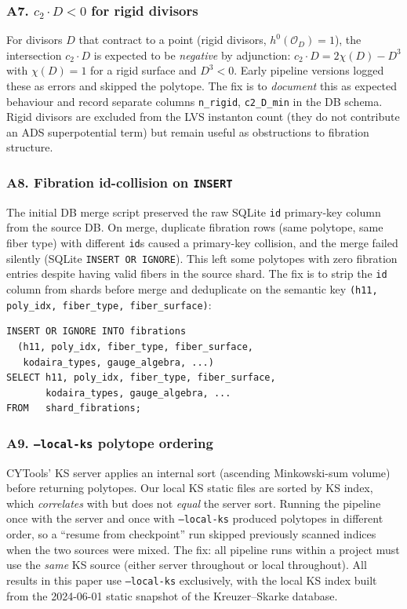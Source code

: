 \documentclass[11pt,a4paper]{article}
\newcommand{\cO}{\mathcal{O}}
\begin{document}
\subsubsection*{A7. $c_2\cdot D < 0$ for rigid divisors}

For divisors $D$ that contract to a point (rigid divisors,
$h^0(\cO_D)=1$), the intersection $c_2\cdot D$ is expected to be
\emph{negative} by adjunction: $c_2\cdot D = 2\chi(D) - D^3$
with $\chi(D) = 1$ for a rigid surface and $D^3 < 0$.
Early pipeline versions logged these as errors and skipped the
polytope.
The fix is to \emph{document} this as expected behaviour and record
separate columns \texttt{n\_rigid}, \texttt{c2\_D\_min} in the DB schema.
Rigid divisors are excluded from the LVS instanton count
(they do not contribute an ADS superpotential term) but remain
useful as obstructions to fibration structure.

\subsubsection*{A8. Fibration id-collision on \texttt{INSERT}}

The initial DB merge script preserved the raw SQLite
\texttt{id} primary-key column from the source DB.
On merge, duplicate fibration rows (same polytope, same fiber type)
with different \texttt{id}s caused a primary-key collision,
and the merge failed silently (SQLite \texttt{INSERT OR IGNORE}).
This left some polytopes with zero fibration entries despite
having valid fibers in the source shard.
The fix is to strip the \texttt{id} column from shards before merge
and deduplicate on the semantic key
\texttt{(h11, poly\_idx, fiber\_type, fiber\_surface)}:
\begin{verbatim}
INSERT OR IGNORE INTO fibrations
  (h11, poly_idx, fiber_type, fiber_surface,
   kodaira_types, gauge_algebra, ...)
SELECT h11, poly_idx, fiber_type, fiber_surface,
       kodaira_types, gauge_algebra, ...
FROM   shard_fibrations;
\end{verbatim}

\subsubsection*{A9. \texttt{--local-ks} polytope ordering}

CYTools' KS server applies an internal sort (ascending
Minkowski-sum volume) before returning polytopes.
Our local KS static files are sorted by KS index,
which \emph{correlates} with but does not \emph{equal}
the server sort.
Running the pipeline once with the server and once with
\texttt{--local-ks} produced polytopes in different order,
so a ``resume from checkpoint'' run skipped previously scanned
indices when the two sources were mixed.
The fix: all pipeline runs within a project must use the
\emph{same} KS source (either server throughout or local
throughout).
All results in this paper use \texttt{--local-ks} exclusively,
with the local KS index built from the 2024-06-01 static snapshot
of the Kreuzer--Skarke database.
\end{document}
